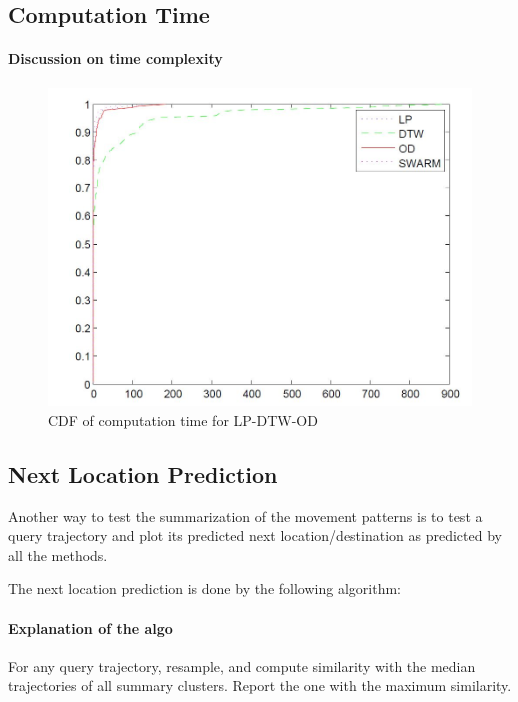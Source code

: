 \subsection{Computation Time}

\paragraph{Discussion on time complexity }

\begin{figure}[H]
\centering     
\includegraphics[scale=0.3]{figs/time_cdf.jpg}
\caption{CDF of computation time  for LP-DTW-OD}
\label{fig:time_cdf}  
\end{figure} 

\subsection{Next Location Prediction}
Another way to test the summarization of the movement patterns is to test a query trajectory and plot its predicted next location/destination as predicted by all the methods.

The next location prediction is done by the following algorithm:
\paragraph{Explanation of the algo}
For any query trajectory, resample, and compute similarity with the median trajectories of all summary clusters. Report the one with the maximum similarity. 


